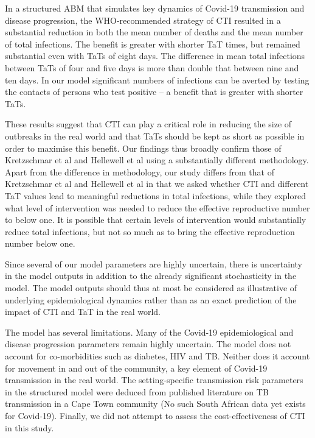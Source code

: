 \documentclass{article}
\begin{document}
In a structured ABM that simulates key dynamics of Covid-19 transmission and
disease progression, the WHO-recommended strategy of CTI resulted in a
substantial reduction in both the mean number of deaths and the mean number of
total infections. The benefit is greater with shorter TaT times, but remained
substantial even with TaTs of eight days. The difference in mean total
infections between TaTs of four and five days is more than double that between
nine and ten days. In our model significant numbers of infections can be averted
by testing the contacts of persons who test positive – a benefit that is greater
with shorter TaTs.

These results suggest that CTI can play a critical role in reducing the size of
outbreaks in the real world and that TaTs should be kept as short as possible in
order to maximise this benefit. Our findings thus broadly confirm those of
Kretzschmar et al and Hellewell et al using a substantially different
methodology.\cite{Kretzschmar2020,Hellewell2020} Apart from the difference in
methodology, our study differs from that of Kretzschmar et al and Hellewell et
al in that we asked whether CTI and different TaT values lead to meaningful
reductions in total infections, while they explored what level of intervention
was needed to reduce the effective reproductive number to below one. It is
possible that certain levels of intervention would substantially reduce total
infections, but not so much as to bring the effective reproduction number below
one.

Since several of our model parameters are highly uncertain, there is uncertainty
in the model outputs in addition to the already significant stochasticity in the
model. The model outputs should thus at most be considered as illustrative of
underlying epidemiological dynamics rather than as an exact prediction of the
impact of CTI and TaT in the real world.

The model has several limitations. Many of the Covid-19 epidemiological and
disease progression parameters remain highly uncertain. The model does not
account for co-morbidities such as diabetes, HIV and TB. Neither does it account
for movement in and out of the community, a key element of Covid-19 transmission
in the real world. The setting-specific transmission risk parameters in the
structured model were deduced from published literature on TB transmission in a
Cape Town community (No such South African data yet exists for
Covid-19). Finally, we did not attempt to assess the cost-effectiveness of CTI
in this study.
\end{document}
